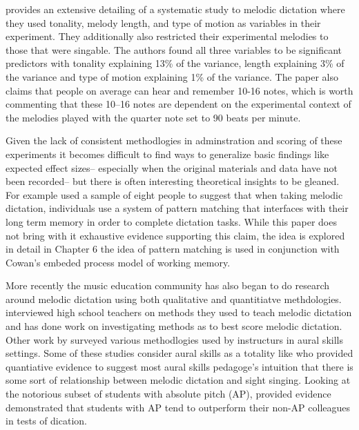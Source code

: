 \documentclass[]{book}
\theoremstyle{definition}
\theoremstyle{definition}
\theoremstyle{definition}
\theoremstyle{remark}
\begin{document}
\citet{pembrookInterferenceTranscriptionProcess1986} provides an
extensive detailing of a systematic study to melodic dictation where
they used tonality, melody length, and type of motion as variables in
their experiment. They additionally also restricted their experimental
melodies to those that were singable. The authors found all three
variables to be significant predictors with tonality explaining 13\% of
the variance, length explaining 3\% of the variance and type of motion
explaining 1\% of the variance. The paper also claims that people on
average can hear and remember 10-16 notes, which is worth commenting
that these 10--16 notes are dependent on the experimental context of the
melodies played with the quarter note set to 90 beats per minute.

Given the lack of consistent methodlogies in adminstration and scoring
of these experiments it becomes difficult to find ways to generalize
basic findings like expected effect sizes-- especially when the original
materials and data have not been recorded-- but there is often
interesting theoretical insights to be gleaned. For example
\citep{ouraConstructingRepresentationMelody1991a} used a sample of eight
people to suggest that when taking melodic dictation, individuals use a
system of pattern matching that interfaces with their long term memory
in order to complete dictation tasks. While this paper does not bring
with it exhaustive evidence supporting this claim, the idea is explored
in detail in Chapter 6 the idea of pattern matching is used in
conjunction with Cowan's embeded process model of working memory.

More recently the music education community has also began to do
research around melodic dictation using both qualitative and
quantitiatve methdologies. \citep{paneyTeachingMelodicDictation2014}
interviewed high school teachers on methods they used to teach melodic
dictation and \citep{gillespieMelodicDictationScoring2001} has done work
on investigating methods as to best score melodic dictation. Other work
by \citep{pembrookSendHelpAural1990} surveyed various methodlogies used
by instructurs in aural skills settings. Some of these studies consider
aural skills as a totality like
\citep{norrisRelationshipSightSinging2003} who provided quantiative
evidence to suggest most aural skills pedagoge's intuition that there is
some sort of relationship between melodic dictation and sight singing.
Looking at the notorious subset of students with absolute pitch (AP),
\citep{dooleyAbsolutePitchCorrelates2010} provided evidence demonstrated
that students with AP tend to outperform their non-AP colleagues in
tests of dication.
\end{document}

